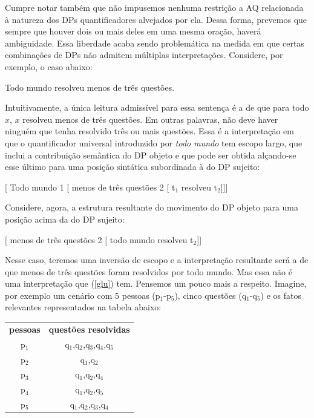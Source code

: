 Cumpre notar também que não impusemos nenhuma restrição a AQ relacionada à natureza dos DPs quantificadores alvejados por ela. Dessa forma, prevemos que sempre que houver dois ou mais deles em uma mesma oração, haverá ambiguidade. Essa liberdade acaba sendo problemática na medida em que certas combinações de DPs não admitem múltiplas interpretações. Considere, por exemplo, o caso abaixo:

\begin{exe}

	\ex Todo mundo resolveu menos de três questões. \label{glu}	
	
\end{exe}

\n Intuitivamente, a única leitura admissível para essa sentença é a de que para todo $x$, $x$ resolveu menos de três questões. Em outras palavras, não deve haver ninguém que tenha resolvido três ou mais questões. Essa é a interpretação em que o quantificador universal introduzido por \textit{todo mundo} tem escopo largo, que inclui a contribuição semântica do DP objeto e que pode ser obtida alçando-se esse último para uma posição sintática subordinada à do DP sujeito:

\begin{exe}
	\ex $[$ Todo mundo 1 [ menos de três questões 2 [ t$_{1}$ resolveu t$_{2}$]]]	
\end{exe}

Considere, agora, a estrutura resultante do movimento do DP objeto para uma posição acima da do DP sujeito:

\begin{exe}
	\ex $[$ menos de três questões 2 [ todo mundo  resolveu t$_{2}$]]	
\end{exe}

\n Nesse caso, teremos uma inversão de escopo e a interpretação resultante será a de que menos de três questões foram resolvidos por todo mundo. Mas essa não é uma interpretação que (\ref{glu}) tem. Pensemos um pouco mais a respeito. Imagine, por exemplo um cenário com 5 pessoas (p$_{1}$-p$_{5}$), cinco questões (q$_{1}$-q$_{5}$) e  os fatos relevantes representados na tabela abaixo:\\

\n \begin{tabular}{c|c}
	\hline 
	\textbf{pessoas} & \textbf{questões resolvidas} \\ 
	p$_{1}$ &  q$_{1}$,q$_{2}$,q$_{3}$,q$_{4}$,q$_{5}$\\ 
	p$_{2}$ &  q$_{1}$,q$_{2}$\\ 
	p$_{3}$ &  q$_{1}$,q$_{2}$,q$_{4}$\\ 
	p$_{4}$ &  q$_{1}$,q$_{2}$,q$_{5}$\\ 
	p$_{5}$ &  q$_{1}$,q$_{2}$,q$_{3}$,q$_{4}$\\ 
	\hline 
\end{tabular} \\

